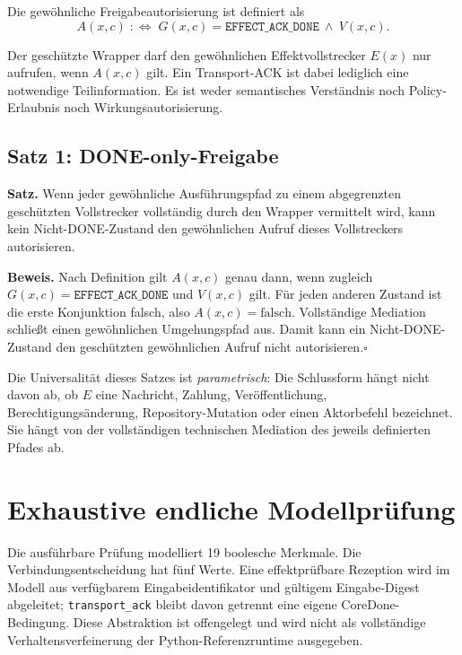 \documentclass[11pt,a4paper]{article}
\newcommand{\DONE}{\texttt{EFFECT\_ACK\_DONE}}
\begin{document}
Die gewöhnliche Freigabeautorisierung ist definiert als
\[
A(x,c)\;:\Longleftrightarrow\;G(x,c)=\DONE\ \land\ V(x,c).
\]

Der geschützte Wrapper darf den gewöhnlichen Effektvollstrecker $E(x)$ nur
aufrufen, wenn $A(x,c)$ gilt. Ein Transport-ACK ist dabei lediglich eine
notwendige Teilinformation. Es ist weder semantisches Verständnis noch
Policy-Erlaubnis noch Wirkungsautorisierung.

\subsection{Satz 1: DONE-only-Freigabe}

\textbf{Satz.} Wenn jeder gewöhnliche Ausführungspfad zu einem abgegrenzten
geschützten Vollstrecker vollständig durch den Wrapper vermittelt wird, kann
kein Nicht-DONE-Zustand den gewöhnlichen Aufruf dieses Vollstreckers
autorisieren.

\textbf{Beweis.} Nach Definition gilt $A(x,c)$ genau dann, wenn zugleich
$G(x,c)=\DONE$ und $V(x,c)$ gilt. Für jeden anderen Zustand ist die erste
Konjunktion falsch, also $A(x,c)=\mathrm{falsch}$. Vollständige Mediation
schließt einen gewöhnlichen Umgehungspfad aus. Damit kann ein Nicht-DONE-
Zustand den geschützten gewöhnlichen Aufruf nicht autorisieren.\hfill$\square$

Die Universalität dieses Satzes ist \emph{parametrisch}: Die Schlussform hängt
nicht davon ab, ob $E$ eine Nachricht, Zahlung, Veröffentlichung,
Berechtigungsänderung, Repository-Mutation oder einen Aktorbefehl bezeichnet.
Sie hängt von der vollständigen technischen Mediation des jeweils definierten
Pfades ab.

\section{Exhaustive endliche Modellprüfung}

Die ausführbare Prüfung modelliert 19 boolesche Merkmale. Die
Verbindungsentscheidung hat fünf Werte. Eine effektprüfbare Rezeption wird im Modell aus
verfügbarem Eingabeidentifikator und gültigem Eingabe-Digest abgeleitet;
\texttt{transport\_ack} bleibt davon getrennt eine eigene CoreDone-Bedingung.
Diese Abstraktion ist offengelegt und wird nicht als vollständige
Verhaltensverfeinerung der Python-Referenzruntime ausgegeben.
\end{document}
